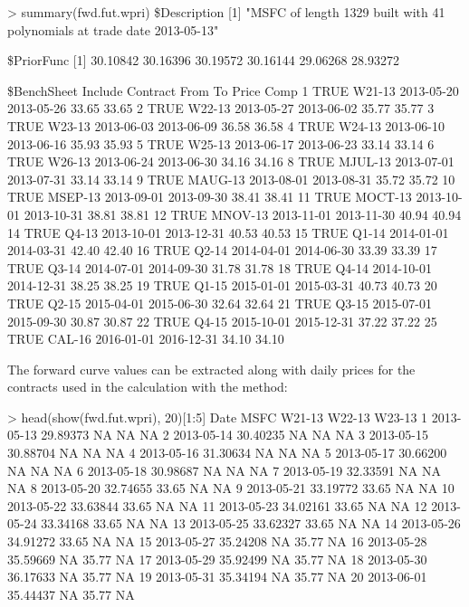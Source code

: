 \begin{example*}
> summary(fwd.fut.wpri)
\$Description
[1] "MSFC of length 1329 built with 41 polynomials at trade date 2013-05-13"

\$PriorFunc
[1] 30.10842 30.16396 30.19572 30.16144 29.06268 28.93272

\vspace{2cm}

\$BenchSheet
   Include Contract       From         To Price  Comp
1     TRUE   W21-13 2013-05-20 2013-05-26 33.65 33.65
2     TRUE   W22-13 2013-05-27 2013-06-02 35.77 35.77
3     TRUE   W23-13 2013-06-03 2013-06-09 36.58 36.58
4     TRUE   W24-13 2013-06-10 2013-06-16 35.93 35.93
5     TRUE   W25-13 2013-06-17 2013-06-23 33.14 33.14
6     TRUE   W26-13 2013-06-24 2013-06-30 34.16 34.16
8     TRUE  MJUL-13 2013-07-01 2013-07-31 33.14 33.14
9     TRUE  MAUG-13 2013-08-01 2013-08-31 35.72 35.72
10    TRUE  MSEP-13 2013-09-01 2013-09-30 38.41 38.41
11    TRUE  MOCT-13 2013-10-01 2013-10-31 38.81 38.81
12    TRUE  MNOV-13 2013-11-01 2013-11-30 40.94 40.94
14    TRUE    Q4-13 2013-10-01 2013-12-31 40.53 40.53
15    TRUE    Q1-14 2014-01-01 2014-03-31 42.40 42.40
16    TRUE    Q2-14 2014-04-01 2014-06-30 33.39 33.39
17    TRUE    Q3-14 2014-07-01 2014-09-30 31.78 31.78
18    TRUE    Q4-14 2014-10-01 2014-12-31 38.25 38.25
19    TRUE    Q1-15 2015-01-01 2015-03-31 40.73 40.73
20    TRUE    Q2-15 2015-04-01 2015-06-30 32.64 32.64
21    TRUE    Q3-15 2015-07-01 2015-09-30 30.87 30.87
22    TRUE    Q4-15 2015-10-01 2015-12-31 37.22 37.22
25    TRUE   CAL-16 2016-01-01 2016-12-31 34.10 34.10
\end{example*}

\vspace{0.5cm}

\noindent The forward curve values can be extracted along with daily prices for the contracts used in the calculation with the  method: \\

\begin{example*}
> head(show(fwd.fut.wpri), 20)[1:5]
         Date     MSFC W21-13 W22-13 W23-13
1  2013-05-13 29.89373     NA     NA     NA
2  2013-05-14 30.40235     NA     NA     NA
3  2013-05-15 30.88704     NA     NA     NA
4  2013-05-16 31.30634     NA     NA     NA
5  2013-05-17 30.66200     NA     NA     NA
6  2013-05-18 30.98687     NA     NA     NA
7  2013-05-19 32.33591     NA     NA     NA
8  2013-05-20 32.74655  33.65     NA     NA
9  2013-05-21 33.19772  33.65     NA     NA
10 2013-05-22 33.63844  33.65     NA     NA
11 2013-05-23 34.02161  33.65     NA     NA
12 2013-05-24 33.34168  33.65     NA     NA
13 2013-05-25 33.62327  33.65     NA     NA
14 2013-05-26 34.91272  33.65     NA     NA
15 2013-05-27 35.24208     NA  35.77     NA
16 2013-05-28 35.59669     NA  35.77     NA
17 2013-05-29 35.92499     NA  35.77     NA
18 2013-05-30 36.17633     NA  35.77     NA
19 2013-05-31 35.34194     NA  35.77     NA
20 2013-06-01 35.44437     NA  35.77     NA
\end{example*}

